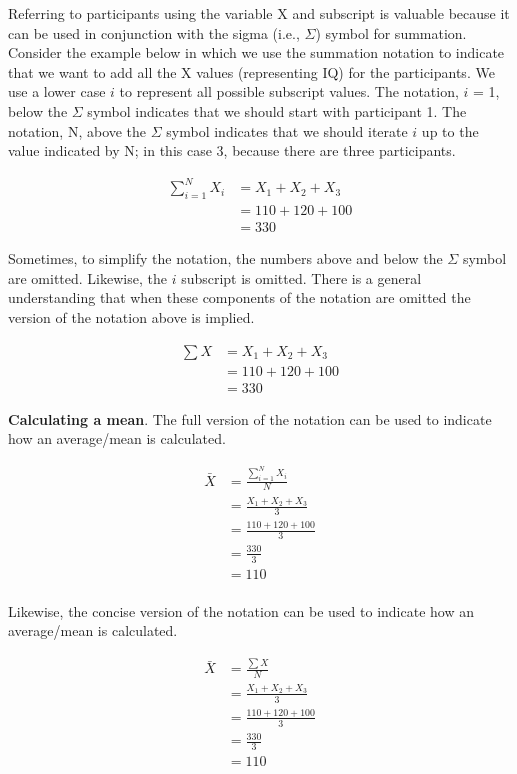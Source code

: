 \documentclass[
]{krantz}
\begin{document}
Referring to participants using the variable X and subscript is valuable because it can be used in conjunction with the sigma (i.e., \(\Sigma\)) symbol for summation. Consider the example below in which we use the summation notation to indicate that we want to add all the X values (representing IQ) for the participants. We use a lower case \(i\) to represent all possible subscript values. The notation, \(i\) = 1, below the \(\Sigma\) symbol indicates that we should start with participant 1. The notation, N, above the \(\Sigma\) symbol indicates that we should iterate \(i\) up to the value indicated by N; in this case 3, because there are three participants.

\[
\begin{aligned} 
\sum_{i=1}^{N} X_i &=  X_1 + X_2 + X_3\\ 
&= 110 + 120 + 100 \\
&= 330
\end{aligned} 
\]

Sometimes, to simplify the notation, the numbers above and below the \(\Sigma\) symbol are omitted. Likewise, the \(i\) subscript is omitted. There is a general understanding that when these components of the notation are omitted the version of the notation above is implied.

\[
\begin{aligned} 
\sum{X} &= X_1 + X_2 + X_3\\ 
&= 110 + 120 + 100\\
&= 330
\end{aligned} 
\]

\textbf{Calculating a mean}. The full version of the notation can be used to indicate how an average/mean is calculated.

\[
\begin{aligned} 
\bar{X} &= \frac{\sum_{i=1}^{N} X_i}{N} \\
&= \frac{X_1 + X_2 + X_3}{3}\\ 
&= \frac{110 + 120 + 100}{3}\\
&= \frac{330}{3}\\
&= 110\\
\end{aligned} 
\]

Likewise, the concise version of the notation can be used to indicate how an average/mean is calculated.

\[
\begin{aligned} 
\bar{X} &= \frac{\sum{X}}{N} \\
&= \frac{X_1 + X_2 + X_3}{3}\\ 
&= \frac{110 + 120 + 100}{3}\\
&= \frac{330}{3}\\
&= 110\\
\end{aligned} 
\]
\end{document}
